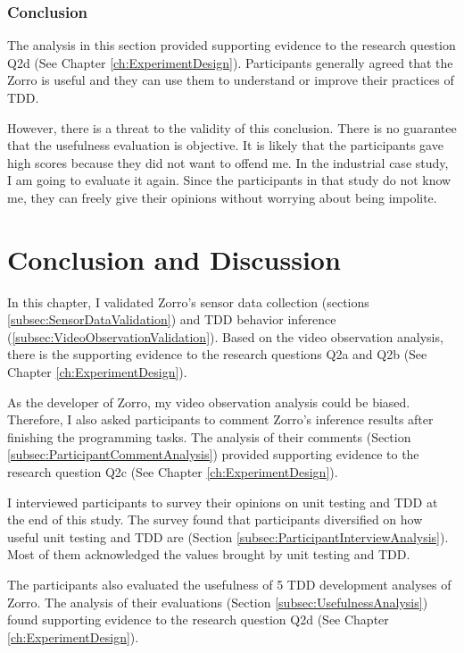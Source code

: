 \subsubsection{Conclusion}
The analysis in this section provided supporting evidence to the
research question Q2d (See Chapter \ref{ch:ExperimentDesign}). 
Participants generally agreed that the Zorro is useful and they can
use them to understand or improve their practices of TDD.

However, there is a threat to the validity of this conclusion. 
There is no guarantee that the usefulness evaluation is objective.
It is likely that the participants gave high scores because
they did not want to offend me. In the industrial case study, I 
am going to evaluate it again. Since the participants in that
study do not know me, they can freely give their opinions without 
worrying about being impolite.

\section{Conclusion and Discussion}
\label{sec:discussion}
In this chapter, I validated Zorro's sensor data collection
(sections \ref{subsec:SensorDataValidation}) and TDD behavior 
inference (\ref{subsec:VideoObservationValidation}). Based on 
the video observation analysis, there is the supporting evidence 
to the research questions Q2a and Q2b 
(See Chapter \ref{ch:ExperimentDesign}).

As the developer of Zorro, my video observation analysis could
be biased. Therefore, I also asked participants to comment
Zorro's inference results after finishing the programming
tasks. The analysis of their comments (Section 
\ref{subsec:ParticipantCommentAnalysis}) provided supporting
evidence to the research question Q2c 
(See Chapter \ref{ch:ExperimentDesign}).

I interviewed participants to survey their opinions on unit 
testing and TDD at the end of this study. The survey found 
that participants diversified on how useful unit testing and 
TDD are (Section \ref{subsec:ParticipantInterviewAnalysis}). 
Most of them acknowledged the values brought by unit testing 
and TDD. 

The participants also evaluated the usefulness of 5 TDD 
development analyses of Zorro. The analysis of their 
evaluations (Section \ref{subsec:UsefulnessAnalysis}) 
found supporting evidence to the research 
question Q2d (See Chapter \ref{ch:ExperimentDesign}). 

